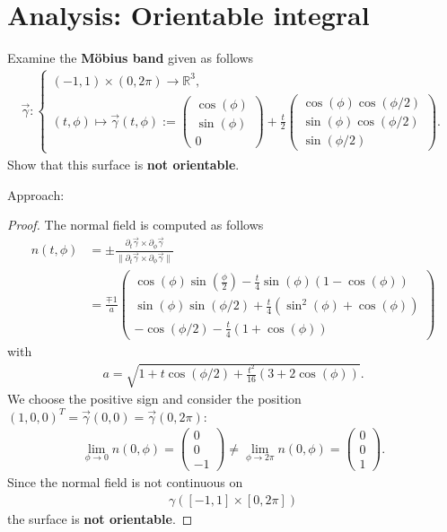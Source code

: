 \documentclass[12pt]{article}
\begin{document}
\section{Analysis: Orientable integral}
\begin{exampleboxed}
	Examine the \textbf{Möbius band} given as follows
	\begin{align}
		\vec{\gamma}:
		\begin{cases}
			(-1,1) \times (0,2\pi) \to \mathbb{R}^3, \\
			(t,\phi) \mapsto 
			\vec{\gamma}(t,\phi) := 
			\begin{pmatrix} \cos(\phi) \\ \sin(\phi) \\ 0 \end{pmatrix}
			+ \frac{t}{2}
			\begin{pmatrix} \cos(\phi) \cos(\phi/2)\\ \sin(\phi) \cos(\phi/2)\\\sin(\phi/2) \end{pmatrix}.
		\end{cases}
	\end{align}
	Show that this surface is \textbf{not orientable}.
\end{exampleboxed}
Approach:
\begin{proof} 
	The normal field is computed as follows
	\begin{align*}
		n(t,\phi) 
		 & = \pm 
		\frac{\partial_t \vec{\gamma} \times \partial_{\phi} \vec{\gamma}}
		{\big\|\partial_t \vec{\gamma} \times \partial_{\phi} \vec{\gamma}\big\|} \\
		 & = \frac{\mp 1}{a}
		\begin{pmatrix}
			\cos(\phi) \sin(\frac{\phi}{2}) - \frac{t}{4} \sin(\phi)(1-\cos(\phi)) \\ 
			\sin(\phi) \sin(\phi/2) + \frac{t}{4} (\sin^2(\phi)+ \cos(\phi))       \\ 
			- \cos(\phi/2) - \frac{t}{4}(1+\cos(\phi))
		\end{pmatrix}
	\end{align*}
	with 
	\begin{align*}
		a = \sqrt{1+t \cos(\phi/2)+\frac{t^2}{16}(3+2 \cos(\phi))}.
	\end{align*}
	We choose the positive sign and consider the position 
	$(1,0,0)^T = \vec{\gamma}(0,0) = \vec{\gamma}(0,2\pi)$:
	\begin{align*}
		\lim_{\phi \to 0} n(0,\phi) 
		= \begin{pmatrix} 0\\0\\-1\end{pmatrix} \neq \lim_{\phi\to 2\pi} n(0,\phi) 
		= \begin{pmatrix} 0\\0\\1\end{pmatrix}.
	\end{align*}
	Since the normal field is not continuous on 
	\begin{align*}
		\gamma([-1,1] \times [0,2\pi])
	\end{align*}
	the surface is \textbf{not orientable}.
\end{proof}
\clearpage
\end{document}

